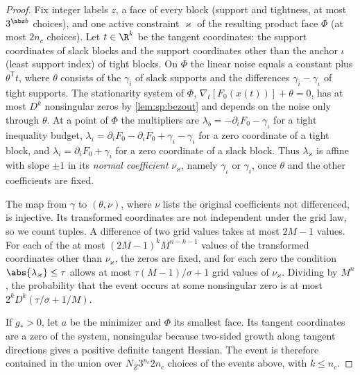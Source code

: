 \begin{proof}
Fix integer labels $z$, a face of every block (support and tightness, at most
$3^{\abs b}$ choices), and one active constraint $\varkappa$ of the resulting
product face $\Phi$ (at most $2n_c$ choices). Let $t\in\R^k$ be the tangent
coordinates: the support coordinates of slack blocks and the support
coordinates other than the anchor $\iota$ (least support index) of tight
blocks. On $\Phi$ the linear noise equals a constant plus
$\theta^{\mathsf T}t$, where $\theta$ consists of the $\gamma_i$ of slack
supports and the differences $\gamma_i-\gamma_\iota$ of tight supports. The
stationarity system of $\Phi$, $\nabla_t[F_0(x(t))]+\theta=0$, has at most
$D^k$ nonsingular zeros by \cref{lem:sp:bezout} and depends on the noise only
through $\theta$. At a point of $\Phi$ the multipliers are
$\lambda_b=-\partial_\iota F_0-\gamma_\iota$ for a tight inequality budget,
$\lambda_i=\partial_iF_0-\partial_\iota F_0+\gamma_i-\gamma_\iota$ for a zero
coordinate of a tight block, and $\lambda_i=\partial_iF_0+\gamma_i$ for a zero
coordinate of a slack block. Thus $\lambda_\varkappa$ is affine with slope
$\pm1$ in its \emph{normal coefficient} $\nu_\varkappa$, namely $\gamma_\iota$
or $\gamma_i$, once $\theta$ and the other coefficients are fixed.

The map from $\gamma$ to $(\theta,\nu)$, where $\nu$ lists the original
coefficients not differenced, is injective. Its transformed coordinates are
not independent under the grid law, so we count tuples. A difference of two
grid values takes at most $2M-1$ values. For each of the at most
$(2M-1)^kM^{n-k-1}$ values of the transformed coordinates other than
$\nu_\varkappa$, the zeros are fixed, and for each zero the condition
$\abs{\lambda_\varkappa}\le\tau$ allows at most $\tau(M-1)/\sigma+1$ grid values
of $\nu_\varkappa$. Dividing by $M^n$, the probability that the event occurs
at some nonsingular zero is at most $2^kD^k(\tau/\sigma+1/M)$.

If $g_*>0$, let $a$ be the minimizer and $\Phi$ its smallest face. Its
tangent coordinates are a zero of the system, nonsingular because two-sided
growth along tangent directions gives a positive definite tangent Hessian.
The event is therefore contained in the union over $N_Z3^{n_c}2n_c$ choices
of the events above, with $k\le n_c$.
\end{proof}

